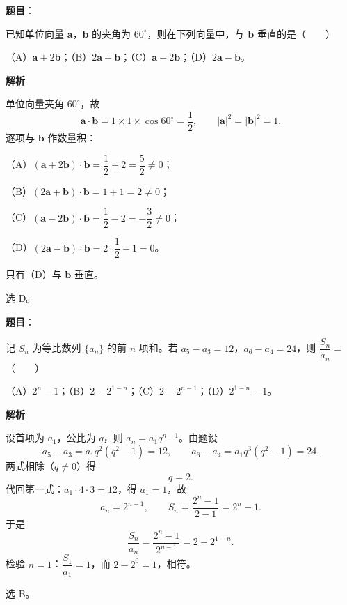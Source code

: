 \begin{answer}

\textbf{题目}：

已知单位向量 $\boldsymbol a$，$\boldsymbol b$ 的夹角为 $60^\circ$，则在下列向量中，与 $\boldsymbol b$ 垂直的是\mbox{（　　）}

（A）$\boldsymbol a+2\boldsymbol b$；（B）$2\boldsymbol a+\boldsymbol b$；（C）$\boldsymbol a-2\boldsymbol b$；（D）$2\boldsymbol a-\boldsymbol b$。

\textbf{解析}

单位向量夹角 $60^\circ$，故
\nopagebreak[4]
\[\boldsymbol a\cdot\boldsymbol b=1\times1\times\cos60^\circ=\frac12,\qquad |\boldsymbol a|^2=|\boldsymbol b|^2=1 .\]
逐项与 $\boldsymbol b$ 作数量积：

（A）$(\boldsymbol a+2\boldsymbol b)\cdot\boldsymbol b=\dfrac12+2=\dfrac52\neq0$；

（B）$(2\boldsymbol a+\boldsymbol b)\cdot\boldsymbol b=1+1=2\neq0$；

（C）$(\boldsymbol a-2\boldsymbol b)\cdot\boldsymbol b=\dfrac12-2=-\dfrac32\neq0$；

（D）$(2\boldsymbol a-\boldsymbol b)\cdot\boldsymbol b=2\cdot\dfrac12-1=0$。

只有（D）与 $\boldsymbol b$ 垂直。

选 D。


\end{answer}
\begin{answer}

\textbf{题目}：

记 $S_n$ 为等比数列 $\{a_n\}$ 的前 $n$ 项和。若 $a_5-a_3=12$，$a_6-a_4=24$，则 $\dfrac{S_n}{a_n}=$\mbox{（　　）}

（A）$2^n-1$；（B）$2-2^{1-n}$；（C）$2-2^{n-1}$；（D）$2^{1-n}-1$。

\textbf{解析}

设首项为 $a_1$，公比为 $q$，则 $a_n=a_1q^{n-1}$。由题设
\nopagebreak[4]
\[a_5-a_3=a_1q^2(q^2-1)=12,\qquad a_6-a_4=a_1q^3(q^2-1)=24 .\]
两式相除（$q\neq0$）得
\nopagebreak[4]
\[q=2 .\]
代回第一式：$a_1\cdot4\cdot3=12$，得 $a_1=1$，故
\nopagebreak[4]
\[a_n=2^{n-1},\qquad S_n=\frac{2^n-1}{2-1}=2^n-1 .\]
于是
\nopagebreak[4]
\[\frac{S_n}{a_n}=\frac{2^n-1}{2^{n-1}}=2-2^{1-n} .\]
检验 $n=1$：$\dfrac{S_1}{a_1}=1$，而 $2-2^{0}=1$，相符。

选 B。


\end{answer}
